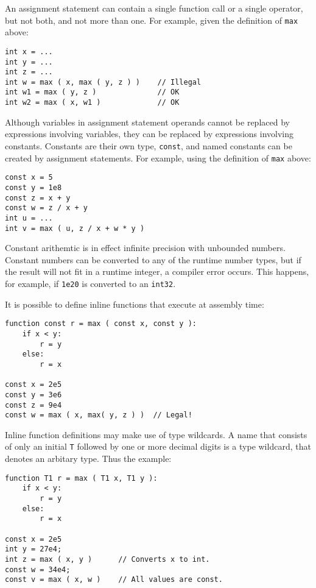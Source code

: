 \documentclass[12pt]{article}
\newenvironment{indpar}[1][0.3in]%
	{\begin{list}{}%
		     {\setlength{\itemsep}{0in}%
		      \setlength{\topsep}{0in}%
		      \setlength{\parsep}{1ex}%
		      \setlength{\labelwidth}{#1}%
		      \setlength{\leftmargin}{#1}%
		      \addtolength{\leftmargin}{\labelsep}}%
	 \item}%
	{\end{list}}
\begin{document}
An assignment statement can contain a single function call
or a single operator, but not both, and not more than one.
For example, given the definition of {\tt max} above:

\begin{indpar}\begin{verbatim}
int x = ...
int y = ...
int z = ...
int w = max ( x, max ( y, z ) )    // Illegal
int w1 = max ( y, z )              // OK
int w2 = max ( x, w1 )             // OK
\end{verbatim}\end{indpar}

Although variables in assignment statement operands cannot be
replaced by expressions involving variables, they can be replaced
by expressions involving constants.  Constants are their own
type, {\tt const}, and named constants can be created by assignment
statements.  For example, using the definition of {\tt max} above:

\begin{indpar}\begin{verbatim}
const x = 5
const y = 1e8
const z = x + y
const w = z / x + y
int u = ...
int v = max ( u, z / x + w * y )
\end{verbatim}\end{indpar}

Constant arithemtic is in effect infinite precision with unbounded
numbers.  Constant numbers can be converted to any of the runtime
number types, but if the result will not fit in a runtime integer,
a compiler error occurs.  This happens, for example, if {\tt 1e20}
is converted to an {\tt int32}.

It is possible to define inline functions that execute at assembly
time:

\begin{indpar}\begin{verbatim}
function const r = max ( const x, const y ):
    if x < y:
        r = y
    else:
        r = x

const x = 2e5
const y = 3e6
const z = 9e4
const w = max ( x, max( y, z ) )  // Legal!
\end{verbatim}\end{indpar}

Inline function definitions may make use of type wildcards.
A name that consists of only an initial {\tt T}
followed by one or more decimal digits is a type wildcard, that denotes
an arbitary type.  Thus the example:

\begin{indpar}\begin{verbatim}
function T1 r = max ( T1 x, T1 y ):
    if x < y:
        r = y
    else:
        r = x

const x = 2e5
int y = 27e4;
int z = max ( x, y )      // Converts x to int.
const w = 34e4;
const v = max ( x, w )    // All values are const.
\end{verbatim}\end{indpar}
\end{document}
